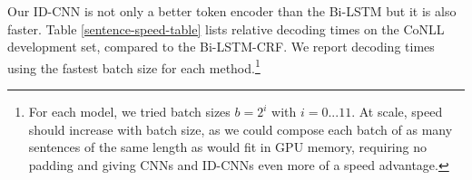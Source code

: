 
Our ID-CNN is not only a better token encoder than the Bi-LSTM but it is also faster. Table \ref{sentence-speed-table} lists relative decoding times on the CoNLL development set, compared to the Bi-LSTM-CRF. We report decoding times using the fastest batch size for each method.\footnote{For each model, we tried batch sizes $b = 2^i$ with $i = 0 ... 11$. At scale, speed should increase with batch size, as we could compose each batch of as many sentences of the same length as would fit in GPU memory, requiring no padding and giving CNNs and ID-CNNs even more of a speed advantage.}


